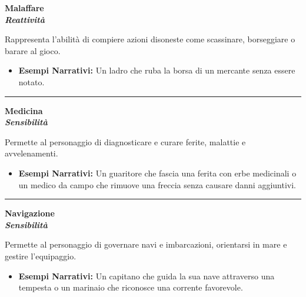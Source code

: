 \documentclass[../manuale_main.tex]{subfiles}
\begin{document}
\begin{center}
\textbf{\large{Malaffare}}\\ \textit{\textbf{Reattività}}\\
\end{center}
Rappresenta l’abilità di compiere azioni disoneste come scassinare, borseggiare o barare al gioco.

\begin{itemize}
\item \textbf{Esempi Narrativi:} Un ladro che ruba la borsa di un mercante senza essere notato.
\end{itemize}


\vspace{0.5cm}
\noindent
\begin{center}
\rule{\textwidth}{0.4pt} 
\end{center}
\vspace{0.5cm}

\begin{center}
\textbf{\large{Medicina}}\\ \textit{\textbf{Sensibilità}}\\
\end{center}
Permette al personaggio di diagnosticare e curare ferite, malattie e avvelenamenti.

\begin{itemize}
\item \textbf{Esempi Narrativi:} Un guaritore che fascia una ferita con erbe medicinali o un medico da campo che rimuove una freccia senza causare danni aggiuntivi.
\end{itemize}


\vspace{0.5cm}
\noindent
\begin{center}
\rule{\textwidth}{0.4pt} 
\end{center}
\vspace{0.5cm}

\begin{center}
\textbf{\large{Navigazione}}\\ \textit{\textbf{Sensibilità}}\\
\end{center}
Permette al personaggio di governare navi e imbarcazioni, orientarsi in mare e gestire l’equipaggio.

\begin{itemize}
\item \textbf{Esempi Narrativi:} Un capitano che guida la sua nave attraverso una tempesta o un marinaio che riconosce una corrente favorevole.
\end{itemize}
\end{document}

